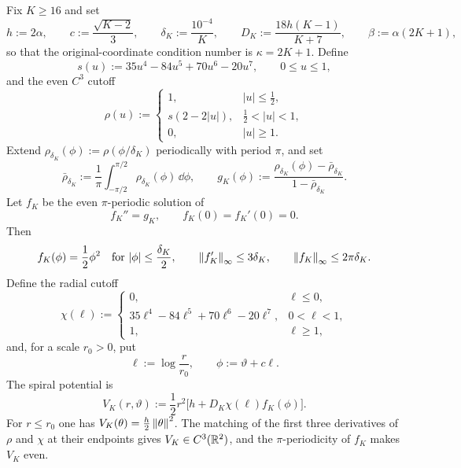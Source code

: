 Fix $K\geq16$ and set
\begin{equation}\label{eq:spiral-parameters}
    h:=2\alpha,
    \qquad
    c:=\frac{\sqrt{K-2}}3,
    \qquad
    \delta_K:=\frac{10^{-4}}K,
    \qquad
    D_K:=\frac{18h(K-1)}{K+7},
    \qquad
    \beta:=\alpha(2K+1),
\end{equation}
so that the original-coordinate condition number is $\kappa=2K+1$. Define
\begin{equation*}
    s(u):=35u^4-84u^5+70u^6-20u^7,
    \qquad 0\leq u\leq1,
\end{equation*}
and the even $C^3$ cutoff
\begin{equation}\label{eq:phase-bump}
    \rho(u):=
    \begin{cases}
        1, & |u|\leq\tfrac12,\\[1mm]
        s(2-2|u|), & \tfrac12<|u|<1,\\[1mm]
        0, & |u|\geq1.
    \end{cases}
\end{equation}
Extend $\rho_{\delta_K}(\phi):=\rho(\phi/\delta_K)$ periodically with period $\pi$, and set
\begin{equation*}
    \bar\rho_{\delta_K}:=\frac1\pi\int_{-\pi/2}^{\pi/2}\rho_{\delta_K}(\phi)\,\dd\phi,
    \qquad
    g_K(\phi):=\frac{\rho_{\delta_K}(\phi)-\bar\rho_{\delta_K}}{1-\bar\rho_{\delta_K}} .
\end{equation*}
Let $f_K$ be the even $\pi$-periodic solution of
\begin{equation}\label{eq:fK}
    f_K''=g_K,
    \qquad
    f_K(0)=f_K'(0)=0 .
\end{equation}
Then
\begin{equation}\label{eq:fK-core-bounds}
    f_K(\phi)=\frac12\phi^2
    \quad\text{for }|\phi|\leq\frac{\delta_K}2,
    \qquad
    \left\lVert f_K'\right\rVert_\infty\leq3\delta_K,
    \qquad
    \left\lVert f_K\right\rVert_\infty\leq2\pi\delta_K .
\end{equation}
Define the radial cutoff
\begin{equation}\label{eq:radial-cutoff}
    \chi(\ell):=
    \begin{cases}
        0, & \ell\leq0,\\
        35\ell^4-84\ell^5+70\ell^6-20\ell^7, & 0<\ell<1,\\
        1, & \ell\geq1,
    \end{cases}
\end{equation}
and, for a scale $r_0>0$, put
\begin{equation}\label{eq:spiral-coords}
    \ell:=\log\frac r{r_0},
    \qquad
    \phi:=\vartheta+c\ell .
\end{equation}
The spiral potential is
\begin{equation}\label{eq:spiral-potential}
    \boxed{
    V_K(r,\vartheta)
    :=\frac12r^2\bigl[h+D_K\chi(\ell)f_K(\phi)\bigr].}
\end{equation}
For $r\leq r_0$ one has $V_K(\theta)=\tfrac h2\left\lVert \theta\right\rVert^2$. The matching of the first three
derivatives of $\rho$ and $\chi$ at their endpoints gives $V_K\in C^3(\mathbb{R}^2)$, and the
$\pi$-periodicity of $f_K$ makes $V_K$ even.

